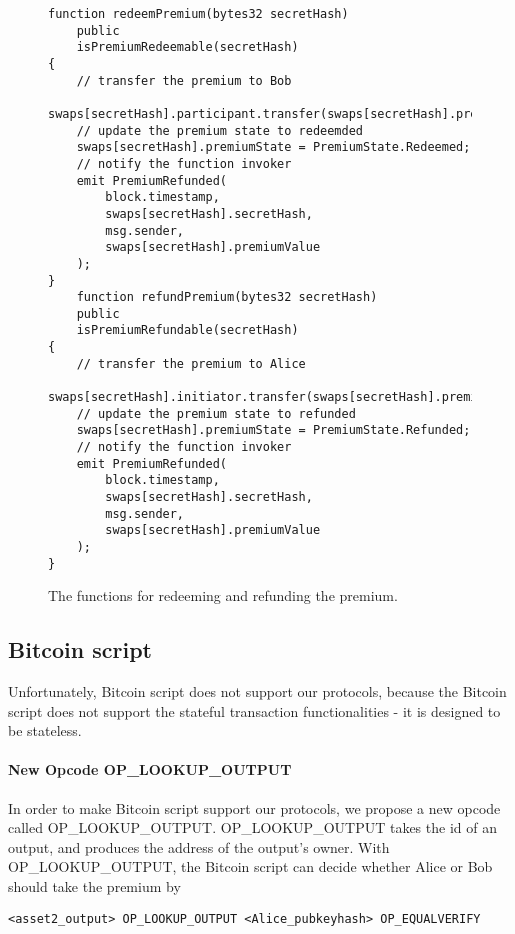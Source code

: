\begin{figure}
\begin{lstlisting}[language=Solidity, basicstyle=\tiny]
function redeemPremium(bytes32 secretHash)
    public
    isPremiumRedeemable(secretHash)
{
    // transfer the premium to Bob
    swaps[secretHash].participant.transfer(swaps[secretHash].premiumValue);
    // update the premium state to redeemded
    swaps[secretHash].premiumState = PremiumState.Redeemed;
    // notify the function invoker
    emit PremiumRefunded(
        block.timestamp,
        swaps[secretHash].secretHash,
        msg.sender,
        swaps[secretHash].premiumValue
    );
}
    function refundPremium(bytes32 secretHash)
    public
    isPremiumRefundable(secretHash)
{
    // transfer the premium to Alice
    swaps[secretHash].initiator.transfer(swaps[secretHash].premiumValue);
    // update the premium state to refunded
    swaps[secretHash].premiumState = PremiumState.Refunded;
    // notify the function invoker
    emit PremiumRefunded(
        block.timestamp,
        swaps[secretHash].secretHash,
        msg.sender,
        swaps[secretHash].premiumValue
    );
}
\end{lstlisting}
\label{code:premium_redeem_refund_function}
\caption{The functions for redeeming and refunding the premium.}
\end{figure}


\subsection{Bitcoin script}

Unfortunately, Bitcoin script does not support our protocols, because the Bitcoin script does not support the stateful transaction functionalities - it is designed to be stateless. 

\paragraph{New Opcode OP\_LOOKUP\_OUTPUT}
In order to make Bitcoin script support our protocols, we propose a new opcode called OP\_LOOKUP\_OUTPUT.
OP\_LOOKUP\_OUTPUT takes the id of an output, and produces the address of the output's owner.
With OP\_LOOKUP\_OUTPUT, the Bitcoin script can decide whether Alice or Bob should take the premium by 

\begin{lstlisting}[language=Solidity, basicstyle=\tiny, numbers=none]
<asset2_output> OP_LOOKUP_OUTPUT <Alice_pubkeyhash> OP_EQUALVERIFY
\end{lstlisting}


